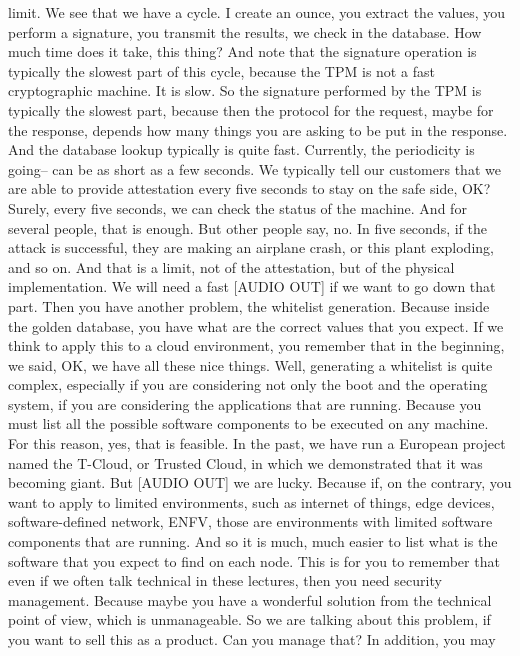  limit. We see that we have a cycle. I create an ounce, you extract the values,
 you perform a signature, you transmit the results, we check in the database.
 How much time does it take, this thing? And note that the signature operation
 is typically the slowest part of this cycle, because the TPM is not a fast
 cryptographic machine. It is slow. So the signature performed by the TPM is
 typically the slowest part, because then the protocol for the request, maybe
 for the response, depends how many things you are asking to be put in the
 response. And the database lookup typically is quite fast. Currently, the
 periodicity is going-- can be as short as a few seconds. We typically tell our
 customers that we are able to provide attestation every five seconds to stay
 on the safe side, OK? Surely, every five seconds, we can check the status of
 the machine. And for several people, that is enough. But other people say, no.
 In five seconds, if the attack is successful, they are making an airplane
 crash, or this plant exploding, and so on. And that is a limit, not of the
 attestation, but of the physical implementation. We will need a fast [AUDIO
 OUT] if we want to go down that part. Then you have another problem, the
 whitelist generation. Because inside the golden database, you have what are
 the correct values that you expect. If we think to apply this to a cloud
 environment, you remember that in the beginning, we said, OK, we have all
 these nice things. Well, generating a whitelist is quite complex, especially
 if you are considering not only the boot and the operating system, if you are
 considering the applications that are running. Because you must list all the
 possible software components to be executed on any machine. For this reason,
 yes, that is feasible. In the past, we have run a European project named the
 T-Cloud, or Trusted Cloud, in which we demonstrated that it was becoming
 giant. But [AUDIO OUT] we are lucky. Because if, on the contrary, you want to
 apply to limited environments, such as internet of things, edge devices,
 software-defined network, ENFV, those are environments with limited software
 components that are running. And so it is much, much easier to list what is
 the software that you expect to find on each node. This is for you to remember
 that even if we often talk technical in these lectures, then you need security
 management. Because maybe you have a wonderful solution from the technical
 point of view, which is unmanageable. So we are talking about this problem, if
 you want to sell this as a product. Can you manage that? In addition, you may
